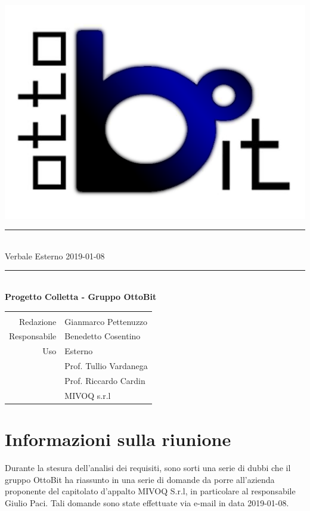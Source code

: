 \documentclass[11pt,a4paper]{article}
\begin{document}
	\begin{titlepage}
  \centering
	\scshape
	
	\vspace*{2cm}
	\includegraphics[scale=0.7]{images/logo.png}
	\rule{\linewidth}{0.2mm}\\[0.37cm]
	{\Huge Verbale Esterno 2019-01-08}\\
	\rule{\linewidth}{0.2mm}\\[1cm]
	{\LARGE\bfseries Progetto Colletta - Gruppo OttoBit}\\[1cm]
	
	
	
	\begin{tabular}{>{\columncolor{Gray}}r | >{\normalfont}l}
		\rowcolor{LightBlue}		
		\multicolumn{2}{c}{\color{white}{Informazioni sul documento}}\\
		Redazione & Gianmarco Pettenuzzo\\
 		Responsabile & Benedetto Cosentino\\
 		Uso & Esterno\\
 																 		& Prof. Tullio Vardanega\\
 																		& Prof. Riccardo Cardin\\
 		\multirow[t]{-3}{*}{Destinatari}	& MIVOQ s.r.l\\
 		\hline
	\end{tabular}
\end{titlepage}

	\tableofcontents
	\newpage	
	
	\section{Informazioni sulla riunione}
	Durante la stesura dell’analisi dei requisiti, sono sorti una serie di dubbi che il gruppo OttoBit ha riassunto in una serie di domande da porre all'azienda proponente del capitolato d'appalto MIVOQ S.r.l, in particolare al responsabile Giulio Paci.
	Tali domande sono state effettuate via e-mail in data 2019-01-08.
	
\end{document}

